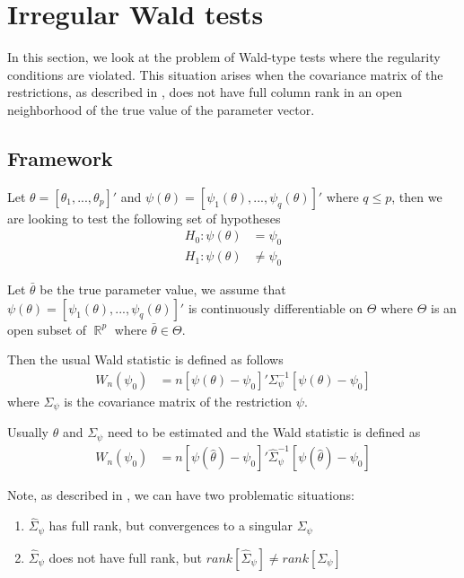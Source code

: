\documentclass[]{article}\usepackage[]{graphicx}\usepackage[]{color}
\DeclareMathOperator{\R}{\mathbb{R}}
\begin{document}
\section{Irregular Wald tests}

In this section, we look at the problem of Wald-type tests where the regularity conditions are violated. This situation arises when the covariance matrix of the restrictions, as described in \cite{dufour_wald_2013,dufour_rank-robust_2016}, does not have full column rank in an open neighborhood of the true value of the parameter vector.

\subsection{Framework}

Let $\theta = [\theta_1,...,\theta_p]'$ and $\psi(\theta)= [\psi_1(\theta),...,\psi_q(\theta)]'$ where $q \leq p$, then we are looking to test the following set of hypotheses
\begin{align}
	H_0: \psi (\theta) & = \psi_0 \\
	H_1: \psi (\theta) & \neq \psi_0
\end{align}

Let $\bar{\theta}$ be the true parameter value, we assume that $\psi(\theta)= [\psi_1(\theta),...,\psi_q(\theta)]'$ is continuously differentiable on $\Theta$ where $\Theta$ is an open subset of $\R^p$ where $\bar{\theta}\in \Theta$.

Then the usual Wald statistic is defined as follows
\begin{align}
	W_n(\psi_0) & = n \left[\psi (\theta) - \psi_0\right]' \Sigma_\psi^{-1} \left[\psi (\theta) - \psi_0\right]
\end{align}
where $\Sigma_\psi$ is the covariance matrix of the restriction $\psi$.

Usually $\theta$ and $\Sigma_\psi$ need to be estimated and the Wald statistic is defined as
\begin{align}
	W_n(\psi_0) & = n \left[\psi (\hat{\theta}) - \psi_0\right]' \hat{\Sigma}_\psi^{-1} \left[\psi (\hat{\theta}) - \psi_0\right]
\end{align}

Note, as described in \cite{dufour_wald_2013,dufour_rank-robust_2016}, we can have two problematic situations:
\begin{enumerate}
	\item $\hat{\Sigma}_\psi$ has full rank, but convergences to a singular  $\Sigma_\psi$
	\item $\hat{\Sigma}_\psi$ does not have full rank, but $rank[\hat{\Sigma}_\psi] \neq rank[\Sigma_\psi]$
\end{enumerate}
\end{document}
